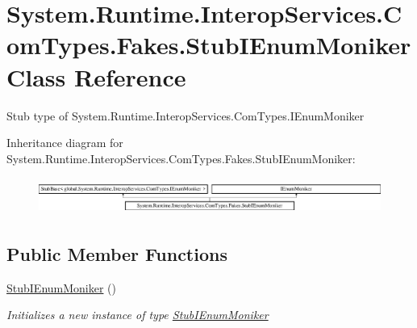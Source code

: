 \hypertarget{class_system_1_1_runtime_1_1_interop_services_1_1_com_types_1_1_fakes_1_1_stub_i_enum_moniker}{\section{System.\-Runtime.\-Interop\-Services.\-Com\-Types.\-Fakes.\-Stub\-I\-Enum\-Moniker Class Reference}
\label{class_system_1_1_runtime_1_1_interop_services_1_1_com_types_1_1_fakes_1_1_stub_i_enum_moniker}
}


Stub type of System.\-Runtime.\-Interop\-Services.\-Com\-Types.\-I\-Enum\-Moniker 


Inheritance diagram for System.\-Runtime.\-Interop\-Services.\-Com\-Types.\-Fakes.\-Stub\-I\-Enum\-Moniker\-:\begin{figure}[H]
\begin{center}
\leavevmode
\includegraphics[height=1.209503cm]{class_system_1_1_runtime_1_1_interop_services_1_1_com_types_1_1_fakes_1_1_stub_i_enum_moniker}
\end{center}
\end{figure}
\subsection*{Public Member Functions}
\begin{DoxyCompactItemize}
\item 
\hyperlink{class_system_1_1_runtime_1_1_interop_services_1_1_com_types_1_1_fakes_1_1_stub_i_enum_moniker_a897866f590ca0686be6d2f25435fc999}{Stub\-I\-Enum\-Moniker} ()
\begin{DoxyCompactList}\small\item\em Initializes a new instance of type \hyperlink{class_system_1_1_runtime_1_1_interop_services_1_1_com_types_1_1_fakes_1_1_stub_i_enum_moniker}{Stub\-I\-Enum\-Moniker}\end{DoxyCompactList}\end{DoxyCompactItemize}
